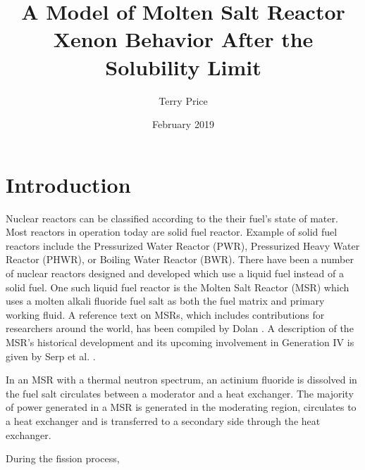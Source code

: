 \documentclass[twocolumn]{article}
\title{A Model of Molten Salt Reactor Xenon Behavior After the Solubility Limit}
\author{Terry Price}
\date{February 2019}
\begin{document}
\maketitle

\section{Introduction}
Nuclear reactors can be classified according to the their fuel's state of mater. Most reactors in operation today are solid fuel reactor. Example of solid fuel reactors include the Pressurized Water Reactor (PWR), Pressurized Heavy Water Reactor (PHWR), or Boiling Water Reactor (BWR).  There have been a number of nuclear reactors designed and developed which use a liquid fuel instead of a solid fuel.  One such liquid fuel reactor is the Molten Salt Reactor (MSR) which uses a molten alkali fluoride fuel salt as both the fuel matrix and primary working fluid. A reference text on MSRs, which includes contributions for researchers around the world, has been compiled by Dolan \cite{Dolan2017}. A description of the MSR's historical development and its upcoming involvement in  Generation IV is given by Serp et al. \cite{Serp2014}.

In an MSR with a thermal neutron spectrum, an actinium fluoride is dissolved in the fuel salt  circulates between a moderator and a heat exchanger.  The majority of power generated in a MSR is generated in the moderating region, circulates to a heat exchanger and is transferred to a secondary side through the heat exchanger.  

During the fission process,  \XeP



\end{document}

